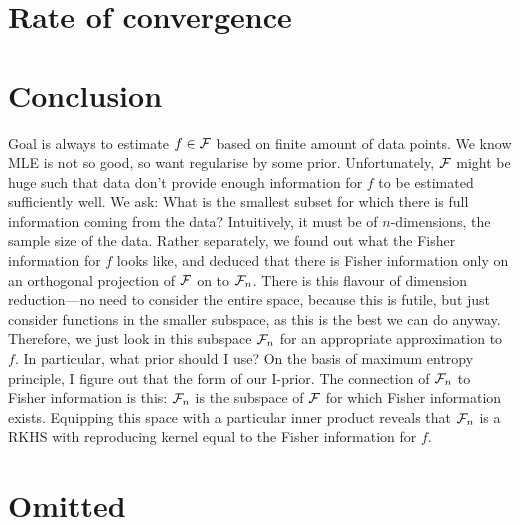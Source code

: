 \documentclass[a4paper,showframe,11pt,draft]{report}
\begin{document}
\section{Rate of convergence}

\section{Conclusion}

Goal is always to estimate $f \in {\mathcal F}$ based on finite amount of data points.
We know MLE is not so good, so want regularise by some prior.
Unfortunately, ${\mathcal F}$ might be huge such that data don't provide enough information for $f$ to be estimated sufficiently well.
We ask: What is the smallest subset for which there is full information coming from the data? 
Intuitively, it must be of $n$-dimensions, the sample size of the data.
Rather separately, we found out what the Fisher information for $f$ looks like, and deduced that there is Fisher information only on an orthogonal projection of ${\mathcal F}$ on to ${\mathcal F}_n$.
There is this flavour of dimension reduction---no need to consider the entire space, because this is futile, but just consider functions in the smaller subspace, as this is the best we can do anyway.
Therefore, we just look in this subspace ${\mathcal F}_n$ for an appropriate approximation to $f$. 
In particular, what prior should I use? On the basis of maximum entropy principle, I figure out that the form of our I-prior.
The connection of ${\mathcal F}_n$ to Fisher information is this: ${\mathcal F}_n$ is the subspace of ${\mathcal F}$ for which Fisher information exists. Equipping this space with a particular inner product reveals that ${\mathcal F}_n$ is a RKHS with reproducing kernel equal to the Fisher information for $f$.



\section{Omitted}



\hClosingStuffStandalone
\end{document}
